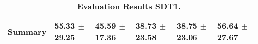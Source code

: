 \begin{table}[htb]
{\begin{tabular}{llllll}
\midrule
\textbf{Summary                                  } &                  \phantom{0}55.33 $\pm$ 29.25 &                      \phantom{0}45.59 $\pm$ 17.36 &                  \phantom{0}38.73 $\pm$ 23.58 &                  \phantom{0}38.75 $\pm$ 23.06 &            \phantom{0}56.64 $\pm$ 27.67 \\
\bottomrule
\end{tabular}%
}
\caption{\textbf{Evaluation Results SDT1.}}
\label{tab:eval-results}
\end{table}


